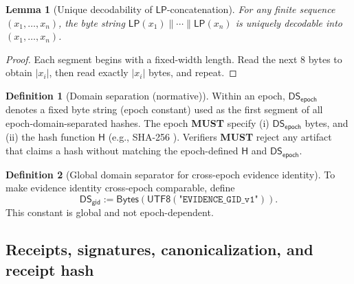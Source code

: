 \documentclass[11pt]{article}
\newcommand{\MUST}{\textbf{MUST}}
\newcommand{\1}{\mathbf{1}}
\newcommand{\Hash}{\mathsf{H}}
\newcommand{\DS}{\mathsf{DS}}
\newcommand{\LP}{\mathsf{LP}}
\theoremstyle{definition}
\newtheorem{definition}{Definition}
\theoremstyle{plain}
\newtheorem{lemma}{Lemma}
\begin{document}
\begin{lemma}[Unique decodability of $\LP$-concatenation]
\label{lem:lp_unique}
For any finite sequence $(x_1,\dots,x_n)$, the byte string $\LP(x_1)\|\cdots\|\LP(x_n)$ is uniquely decodable into $(x_1,\dots,x_n)$.
\end{lemma}
\begin{proof}
Each segment begins with a fixed-width length. Read the next 8 bytes to obtain $|x_i|$, then read exactly $|x_i|$ bytes, and repeat.
\end{proof}

\begin{definition}[Domain separation (normative)]
\label{def:ds}
Within an epoch, $\DS_{\textsf{epoch}}$ denotes a fixed byte string (epoch constant) used as the first segment of all epoch-domain-separated hashes. The epoch \MUST{} specify (i) $\DS_{\textsf{epoch}}$ bytes, and (ii) the hash function $\Hash$ (e.g., SHA-256 \cite{NISTFIPS1804}). Verifiers \MUST{} reject any artifact that claims a hash without matching the epoch-defined $\Hash$ and $\DS_{\textsf{epoch}}$.
\end{definition}

\begin{definition}[Global domain separator for cross-epoch evidence identity]
\label{def:ds_global}
To make evidence identity cross-epoch comparable, define
\[
\DS_{\textsf{gid}}:=\mathsf{Bytes}(\textsf{UTF8}(\texttt{"EVIDENCE\_GID\_v1"})).
\]
This constant is global and not epoch-dependent.
\end{definition}

\subsection{Receipts, signatures, canonicalization, and receipt hash}
\end{document}
